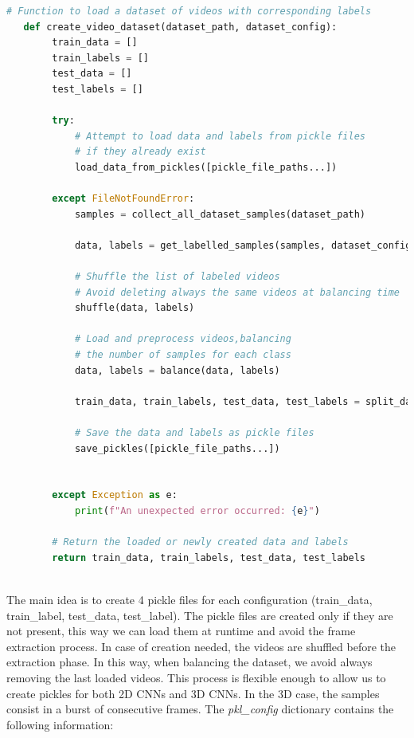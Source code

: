 \begin{lstlisting}[language=python, caption={Pseudocode of pickles generation logic}, label={lst:PicklesGeneration}]
    # Function to load a dataset of videos with corresponding labels
   def create_video_dataset(dataset_path, dataset_config):
        train_data = []
        train_labels = []
        test_data = []
        test_labels = []
        
        try:
            # Attempt to load data and labels from pickle files 
            # if they already exist
            load_data_from_pickles([pickle_file_paths...])
    
        except FileNotFoundError:
            samples = collect_all_dataset_samples(dataset_path)
			
            data, labels = get_labelled_samples(samples, dataset_config)
    
            # Shuffle the list of labeled videos
            # Avoid deleting always the same videos at balancing time
            shuffle(data, labels)
    
            # Load and preprocess videos,balancing
            # the number of samples for each class
            data, labels = balance(data, labels)
            
            train_data, train_labels, test_data, test_labels = split_data(data, labels, testing_split)
   
            # Save the data and labels as pickle files
            save_pickles([pickle_file_paths...])
    
    
        except Exception as e:
            print(f"An unexpected error occurred: {e}")
    
        # Return the loaded or newly created data and labels
        return train_data, train_labels, test_data, test_labels
    

\end{lstlisting}
The main idea is to create 4 pickle files for each configuration (train\_data, train\_label, test\_data, test\_label). The pickle files are created only if they are not present, this way we can load them at runtime and avoid the frame extraction process. In case of creation needed, the videos are shuffled before the extraction phase. In this way, when balancing the dataset, we avoid always removing the last loaded videos. This process is flexible enough to allow us to create pickles for both 2D CNNs and 3D CNNs. In the 3D case, the samples consist in a burst of consecutive frames. The \textit{pkl\_config} dictionary contains the following information:

